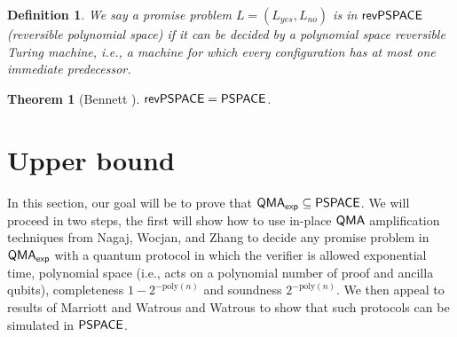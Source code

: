 \documentclass[11pt]{article}
\newtheorem{theorem}{Theorem}
\newtheorem{definition}{Definition}
\theoremstyle{definition}
\theoremstyle{remark}
\newcommand\QMA{{\sf{QMA}}}
\newcommand\PSPACE{{\sf{PSPACE}}}
\newcommand\QMAexp{{\sf{QMA}_{exp}}}
\newcommand\revPSPACE{{\sf{revPSPACE}}}
\newcommand{\poly}{\mathrm{poly}}
\begin{document}
\begin{definition}We say a promise problem $L=(L_{yes},L_{no})$ is in $\revPSPACE$ (reversible polynomial space) if it can be decided by a polynomial space reversible Turing machine, i.e., a machine for which every configuration has at most one immediate predecessor.  	
\end{definition}

\begin{theorem}[Bennett \cite{bennett89}]\label{thm:revpspace}$\revPSPACE=\PSPACE$.
\end{theorem}

\section{Upper bound}
In this section, our goal will be to prove that $\QMAexp\subseteq\PSPACE$.  We will proceed in two steps, the first will show how to use in-place $\QMA$ amplification techniques from Nagaj, Wocjan, and Zhang \cite{nwz11} to decide any promise problem in $\QMAexp$ with a quantum protocol in which the verifier is allowed exponential time, polynomial space (i.e., acts on a polynomial number of proof and ancilla qubits), completeness $1-2^{-\poly(n)}$ and soundness $2^{-\poly(n)}$.  We then appeal to results of Marriott and Watrous \cite{mw05} and  Watrous \cite{Watrous99,Watrous03} to show that such protocols can be simulated in $\PSPACE$.
\end{document}
